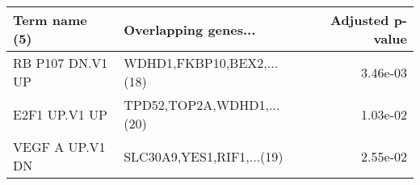 \begin{tabular}{llr}
\toprule
   Term name (5) &      Overlapping genes... &  Adjusted p-value \\
\midrule
RB P107 DN.V1 UP & WDHD1,FKBP10,BEX2,...(18) &          3.46e-03 \\
   E2F1 UP.V1 UP & TPD52,TOP2A,WDHD1,...(20) &          1.03e-02 \\
 VEGF A UP.V1 DN & SLC30A9,YES1,RIF1,...(19) &          2.55e-02 \\
\bottomrule
\end{tabular}
